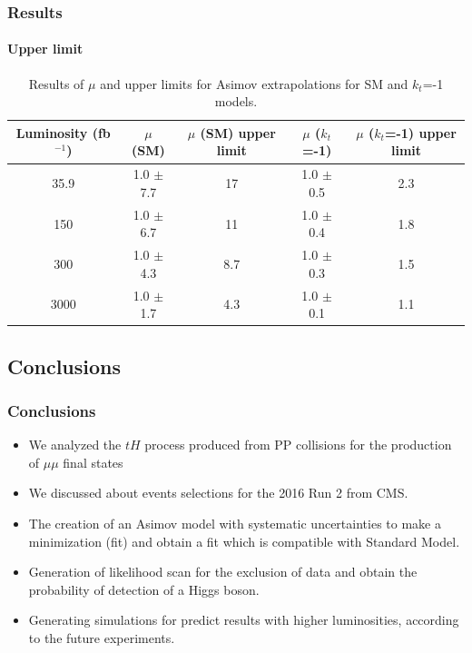 \documentclass[11pt]{beamer}
\begin{document}
\begin{frame}
\frametitle{Results}
\framesubtitle{Upper limit}
\tiny{
\begin{table}[ht!]
	\caption*{Results of $\mu$ and upper limits for Asimov extrapolations for SM and $k_t$=-1 models.}
	\begin{tabular}{|c|c|c|c|c|}
		\hline
		Luminosity (fb$^{-1}$)	&$\mu$ (SM) &$\mu$ (SM) upper limit & $\mu$ ($k_t$=-1) &$\mu$ ($k_t$=-1) upper limit \\
		\hline
		35.9 & 1.0 $\pm$ 7.7 & 17 & 1.0 $\pm$ 0.5 & 2.3 \\
		\hline
		150& 1.0 $\pm$ 6.7& 11 & 1.0 $\pm$ 0.4 &1.8\\
		\hline
		300&1.0 $\pm$ 4.3 &8.7 & 1.0 $\pm$ 0.3 &1.5 \\
		\hline
		3000&1.0 $\pm$ 1.7 & 4.3 &	 1.0 $\pm$ 0.1 & 1.1\\
		\hline
	\end{tabular}
	\label{upper}
\end{table}
}
\end{frame}


\begin{frame}
\section{Conclusions}
\frametitle{Conclusions}
\begin{itemize}
	\item We analyzed the $tH$ process produced from PP collisions for the production of $\mu\mu$ final states   
	\item We discussed about events selections for the 2016 Run 2 from CMS.
	\item The creation of an Asimov model with systematic uncertainties to make a minimization (fit) and obtain a fit which is compatible with Standard Model.
	\item Generation of likelihood scan for the exclusion of data and obtain the probability of detection of a Higgs boson.
	\item Generating simulations for predict results with higher luminosities, according to the future experiments. 
\end{itemize}
\end{frame}
\end{document}
